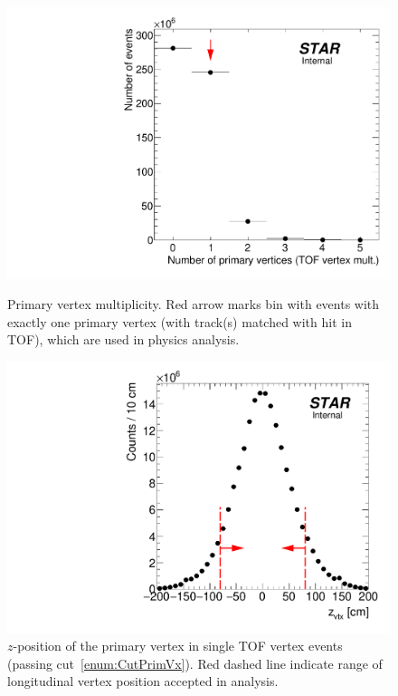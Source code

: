 \begin{figure}[ht!]%
\centering%
\begin{minipage}{.4725\textwidth}%
  \centering%
  \includegraphics[width=\linewidth]{graphics/eventSelection/NumberOfPrimaryVertices.pdf}%
  \caption{Primary vertex multiplicity. Red arrow marks bin with events with exactly one primary vertex (with track(s) matched with hit in TOF), which are used in physics analysis.}\label{fig:NumberOfPrimaryVertices}
\end{minipage}%
\quad\quad%
\begin{minipage}{.4725\textwidth}%
  \centering
  \includegraphics[width=\linewidth]{graphics/eventSelection/zVertex_oneTof.pdf}%
  \caption{\texorpdfstring{$z$}{z}-position of the primary vertex in single TOF vertex events (passing cut~\ref{enum:CutPrimVx}). Red dashed line indicate range of longitudinal vertex position accepted in analysis.}\label{fig:zVertexTpc}
\end{minipage}%
\end{figure}%


